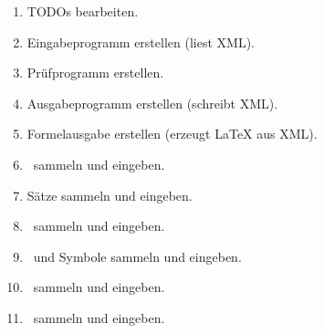 \begin{enumerate}
	\item TODOs bearbeiten.
	\item Eingabeprogramm erstellen (liest XML).
	\item Prüfprogramm erstellen.
	\item Ausgabeprogramm erstellen (schreibt XML).
	\item Formelausgabe erstellen (erzeugt \LaTeX{} aus XML).
	\item \Axiome\ sammeln und eingeben.
	\item Sätze sammeln und eingeben.
	\item \Beweise\ sammeln und eingeben.
	\item \Fachbegriffe\ und Symbole sammeln und eingeben.
	\item \Fachgebiete\ sammeln und eingeben.
	\item \Ausgabeschemata\ sammeln und eingeben.
\end{enumerate}

\Endchapter
